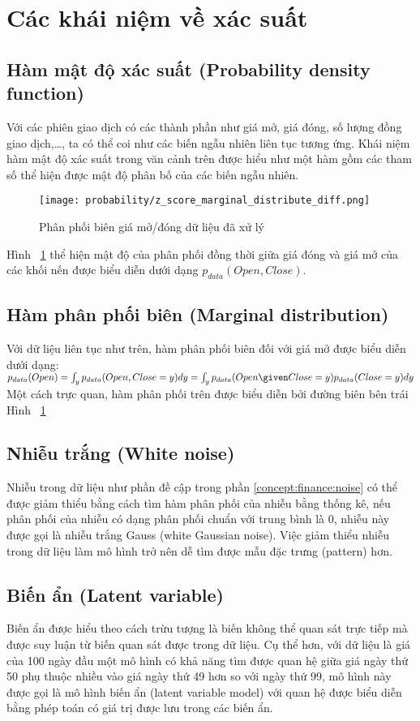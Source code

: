 \section{Các khái niệm về xác suất}


\subsection{Hàm mật độ xác suất (Probability density function)}
Với các phiên giao dịch có các thành phần như giá mở, giá đóng, số lượng đồng giao dịch,\dots, ta có thể coi như các biến ngẫu nhiên liên tục tương ứng. Khái niệm hàm mật độ xác suất trong văn cảnh trên được hiểu như một hàm gồm các tham số thể hiện được mật độ phân bố của các biến ngẫu nhiên.
\begin{figure}[hbt!]
	\center	\texttt{[image: probability/z\_score\_marginal\_distribute\_diff.png]}
	\caption{Phân phối biên giá mở/đóng dữ liệu đã xử lý}
	\label{fig:z_score_marginal_distribution_diff}
\end{figure}
\FloatBarrier
Hình ~\ref{fig:z_score_marginal_distribution_diff} thể hiện mật độ của phân phối đồng thời giữa giá đóng và giá mở của các khối nến được biểu diễn dưới dạng $p_{data}(Open, Close)$.
\subsection{Hàm phân phối biên (Marginal distribution)}
Với dữ liệu liên tục như trên, hàm phân phối biên đối với giá mở được biểu diễn dưới dạng:
$p_{data}(Open) = \int_y p_{data}(Open, Close=y) dy = \int_y p_{data}(Open \given Close=y)p_{data}(Close=y)dy$ Một cách trực quan, hàm phân phối trên được biểu diễn bởi đường biên bên trái Hình ~\ref{fig:z_score_marginal_distribution_diff}

\subsection{Nhiễu trắng (White noise)}
Nhiễu trong dữ liệu như phần đề cập trong phần \ref{concept:finance:noise} có thể được giảm thiểu bằng cách tìm hàm phân phối của nhiễu bằng thống kê, nếu phân phối của nhiễu có dạng phân phối chuẩn với trung bình là 0, nhiễu này được gọi là nhiễu trắng Gauss (white Gaussian noise). Việc giảm thiểu nhiễu trong dữ liệu làm mô hình trở nên dễ tìm được mẫu đặc trưng (pattern) hơn.

\subsection{Biến ẩn (Latent variable)}
Biến ẩn được hiểu theo cách trừu tượng là biến không thể quan sát trực tiếp\cite[trang~264]{bishop} mà được suy luận từ biến quan sát được trong dữ liệu. Cụ thể hơn, với dữ liệu là giá của 100 ngày đầu một mô hình có khả năng tìm được quan hệ giữa giá ngày thứ 50 phụ thuộc nhiều vào giá ngày thứ 49 hơn so với ngày thứ 99, mô hình này được gọi là mô hình biến ẩn (latent variable model) với quan hệ được biểu diễn bằng phép toán có giá trị được lưu trong các biến ẩn.
